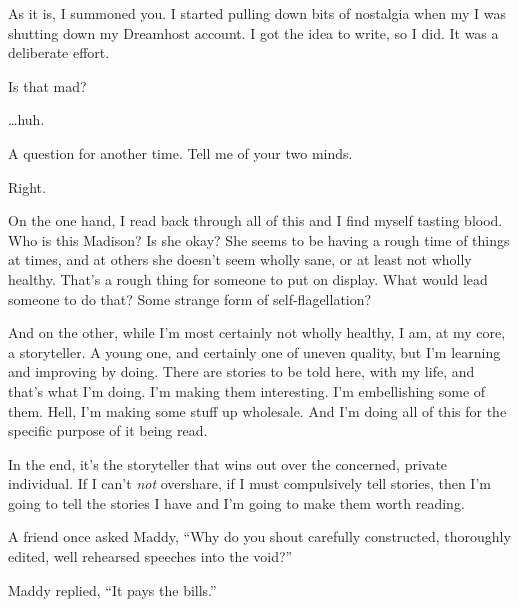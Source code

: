\begin{paracol}{2}
\begin{leftcolumn}
As it is, I summoned you. I started pulling down bits of nostalgia when my I was shutting down my Dreamhost account. I got the idea to write, so I did. It was a deliberate effort.

\begin{ally}
Is that mad?
\end{ally}
\ldots{}huh.

\begin{ally}
A question for another time. Tell me of your two minds.
\end{ally}
Right.

On the one hand, I read back through all of this and I find myself tasting blood. Who is this Madison? Is she okay? She seems to be having a rough time of things at times, and at others she doesn't seem wholly sane, or at least not wholly healthy. That's a rough thing for someone to put on display. What would lead someone to do that? Some strange form of self-flagellation?

And on the other, while I'm most certainly not wholly healthy, I am, at my core, a storyteller. A young one, and certainly one of uneven quality, but I'm learning and improving by doing. There are stories to be told here, with my life, and that's what I'm doing. I'm making them interesting. I'm embellishing some of them. Hell, I'm making some stuff up wholesale. And I'm doing all of this for the specific purpose of it being read.

In the end, it's the storyteller that wins out over the concerned, private individual. If I can't \emph{not} overshare, if I must compulsively tell stories, then I'm going to tell the stories I have and I'm going to make them worth reading.

\begin{ally}
A friend once asked Maddy, ``Why do you shout carefully constructed, thoroughly edited, well rehearsed speeches into the void?''
\end{ally}
Maddy replied, ``It pays the bills.''

  \end{leftcolumn}
\end{paracol}
